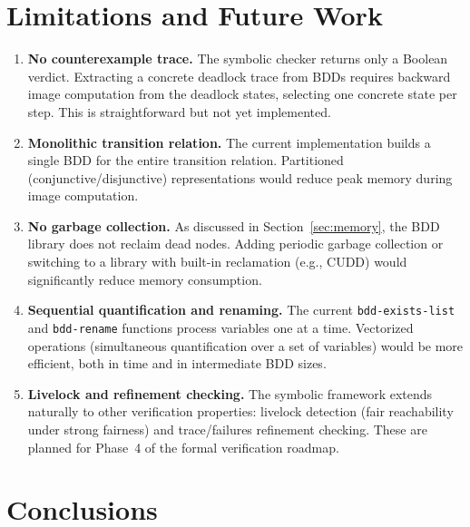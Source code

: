 \documentclass[11pt]{article}
\begin{document}
\section{Limitations and Future Work}

\begin{enumerate}
\item \textbf{No counterexample trace.}  The symbolic checker returns
      only a Boolean verdict.  Extracting a concrete deadlock trace
      from BDDs requires backward image computation from the deadlock
      states, selecting one concrete state per step.  This is
      straightforward but not yet implemented.

\item \textbf{Monolithic transition relation.}  The current
      implementation builds a single BDD for the entire transition
      relation.  Partitioned (conjunctive/disjunctive) representations
      would reduce peak memory during image computation.

\item \textbf{No garbage collection.}  As discussed in
      Section~\ref{sec:memory}, the BDD library does not reclaim dead
      nodes.  Adding periodic garbage collection or switching to a
      library with built-in reclamation (e.g., CUDD) would
      significantly reduce memory consumption.

\item \textbf{Sequential quantification and renaming.}  The current
      \texttt{bdd-exists-list} and \texttt{bdd-rename} functions
      process variables one at a time.  Vectorized operations
      (simultaneous quantification over a set of variables) would be
      more efficient, both in time and in intermediate BDD sizes.

\item \textbf{Livelock and refinement checking.}  The symbolic
      framework extends naturally to other verification properties:
      livelock detection (fair reachability under strong fairness) and
      trace/failures refinement checking.  These are planned for
      Phase~4 of the formal verification roadmap.
\end{enumerate}

\section{Conclusions}
\end{document}
